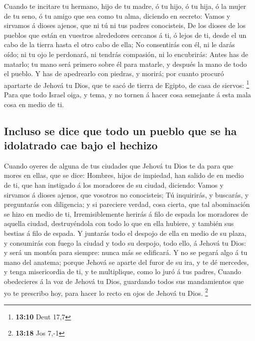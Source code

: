  Cuando te incitare tu hermano, hijo de tu madre, ó tu hijo,
ó tu hija, ó la mujer de tu seno, ó tu amigo que sea como tu alma,
diciendo en secreto: Vamos y sirvamos á dioses ajenos, que ni tú ni tus
padres conocisteis,  De los dioses de los pueblos que están
en vuestros alrededores cercanos á ti, ó lejos de ti, desde el un cabo
de la tierra hasta el otro cabo de ella;  No consentirás con
él, ni le darás oído; ni tu ojo le perdonará, ni tendrás compasión, ni
lo encubrirás:  Antes has de matarlo; tu mano será primero
sobre él para matarle, y después la mano de todo el pueblo.
 Y has de apedrearlo con piedras, y morirá; por cuanto
procuró apartarte de Jehová tu Dios, que te sacó de tierra de Egipto, de
casa de siervos: \footnote{\textbf{13:10} Deut 17,7}  Para
que todo Israel oiga, y tema, y no tornen á hacer cosa semejante á esta
mala cosa en medio de ti.

\hypertarget{incluso-se-dice-que-todo-un-pueblo-que-se-ha-idolatrado-cae-bajo-el-hechizo}{%
\subsection{Incluso se dice que todo un pueblo que se ha idolatrado cae
bajo el
hechizo}\label{incluso-se-dice-que-todo-un-pueblo-que-se-ha-idolatrado-cae-bajo-el-hechizo}}

 Cuando oyeres de alguna de tus ciudades que Jehová tu Dios
te da para que mores en ellas, que se dice:  Hombres, hijos
de impiedad, han salido de en medio de ti, que han instigado á los
moradores de su ciudad, diciendo: Vamos y sirvamos á dioses ajenos, que
vosotros no conocisteis;  Tú inquirirás, y buscarás, y
preguntarás con diligencia; y si pareciere verdad, cosa cierta, que tal
abominación se hizo en medio de ti,  Irremisiblemente
herirás á filo de espada los moradores de aquella ciudad, destruyéndola
con todo lo que en ella hubiere, y también sus bestias á filo de espada.
 Y juntarás todo el despojo de ella en medio de su plaza, y
consumirás con fuego la ciudad y todo su despojo, todo ello, á Jehová tu
Dios: y será un montón para siempre: nunca más se edificará.
 Y no se pegará algo á tu mano del anatema; porque Jehová
se aparte del furor de su ira, y te dé mercedes, y tenga misericordia de
ti, y te multiplique, como lo juró á tus padres,  Cuando
obedecieres á la voz de Jehová tu Dios, guardando todos sus mandamientos
que yo te prescribo hoy, para hacer lo recto en ojos de Jehová tu Dios.
\footnote{\textbf{13:18} Jos 7,-1}


